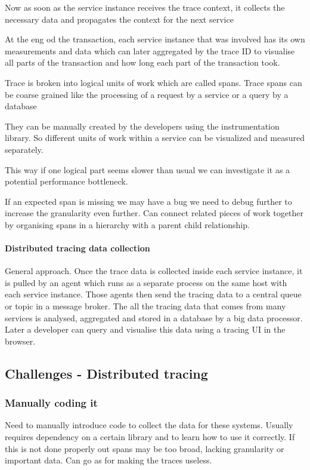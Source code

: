 Now as soon as the service instance receives the trace context, it collects the necessary data and propagates the context for the next service

At the eng od the transaction, each service instance that was involved has its own measurements and data which can later aggregated by the trace ID to visualise all parts of the transaction and how long each part of the transaction took.

Trace is broken into logical units of work which are called spans.
Trace spans can be coarse grained like the processing of a request by a service or a query by a database

They can be manually created by the developers using the instrumentation library.
So different units of work within a service can be visualized and measured separately.

This way if one logical part seems slower than usual we can investigate it as a potential performance bottleneck.

If an expected span is missing we may have a bug we need to debug further to increase the granularity even further.
Can connect related pieces of work together by organising spans in a hierarchy with a parent child relationship.

\paragraph{Distributed tracing data collection}
General approach.
Once the trace data is collected inside each service instance, it is pulled by an agent which runs as a separate process on the same host with each service instance.
Those agents then send the tracing data to a central queue or topic in a message broker.
The all the tracing data that comes from many services is analysed, aggregated and stored in a database by a big data processor.
Later a developer can query and visualise this data using a tracing UI in the browser.

\subsection{Challenges - Distributed tracing}

\subsubsection{Manually coding it}
Need to manually introduce code to collect the data for these systems.
Usually requires dependency on a certain library and to learn how to use it correctly.
If this is not done properly out spans may be too broad, lacking granularity or important data.
Can go as for making the traces useless.


